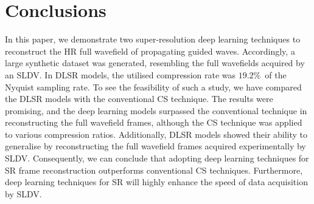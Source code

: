 \section{Conclusions}
\label{conclusion}
In this paper, we demonstrate two super-resolution deep learning techniques to reconstruct the HR full wavefield of propagating guided waves.
Accordingly, a large synthetic dataset was generated, resembling the full wavefields acquired by an SLDV.
In DLSR models, the utilised compression rate was \(19.2\%\)\ of the Nyquist sampling rate.
To see the feasibility of such a study, we have compared the DLSR models with the conventional CS technique. 
The results were promising, and the deep learning models surpassed the conventional technique in reconstructing the full wavefield frames, although the CS technique was applied to various compression ratios.
Additionally, DLSR models showed their ability to generalise by reconstructing the full wavefield frames acquired experimentally by SLDV.
Consequently, we can conclude that adopting deep learning techniques for SR frame reconstruction outperforms conventional CS techniques.
Furthermore, deep learning techniques for SR will highly enhance the speed of data acquisition by SLDV.

